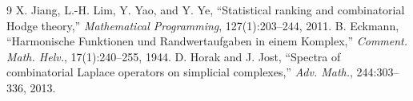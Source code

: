 \documentclass[11pt,a4paper]{article}
\begin{document}
\begin{thebibliography}{9}
 X. Jiang, L.-H. Lim, Y. Yao, and Y. Ye, ``Statistical ranking and combinatorial Hodge theory,'' \emph{Mathematical Programming}, 127(1):203--244, 2011.
 B. Eckmann, ``Harmonische Funktionen und Randwertaufgaben in einem Komplex,'' \emph{Comment. Math. Helv.}, 17(1):240--255, 1944.
 D. Horak and J. Jost, ``Spectra of combinatorial Laplace operators on simplicial complexes,'' \emph{Adv. Math.}, 244:303--336, 2013.
\end{thebibliography}
\end{document}
